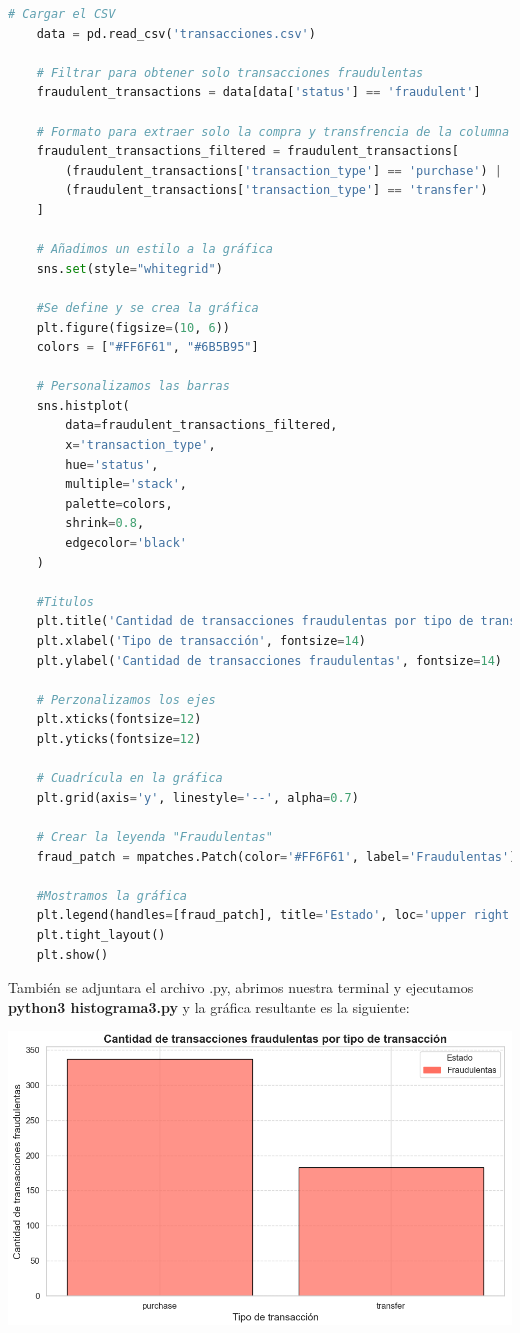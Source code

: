\documentclass{article}
\begin{document}
\begin{itemize}
\begin{lstlisting}[language=Python, caption=Implementación DES(Data Encryption Standard)]
    # Cargar el CSV
    data = pd.read_csv('transacciones.csv')

    # Filtrar para obtener solo transacciones fraudulentas
    fraudulent_transactions = data[data['status'] == 'fraudulent']

    # Formato para extraer solo la compra y transfrencia de la columna 'purchase' y 'transfer'
    fraudulent_transactions_filtered = fraudulent_transactions[
        (fraudulent_transactions['transaction_type'] == 'purchase') | 
        (fraudulent_transactions['transaction_type'] == 'transfer')
    ]

    # Añadimos un estilo a la gráfica
    sns.set(style="whitegrid")

    #Se define y se crea la gráfica
    plt.figure(figsize=(10, 6)) 
    colors = ["#FF6F61", "#6B5B95"]

    # Personalizamos las barras
    sns.histplot(
        data=fraudulent_transactions_filtered, 
        x='transaction_type', 
        hue='status', 
        multiple='stack', 
        palette=colors,
        shrink=0.8,  
        edgecolor='black'  
    )

    #Titulos
    plt.title('Cantidad de transacciones fraudulentas por tipo de transacción', fontsize=16, fontweight='bold')
    plt.xlabel('Tipo de transacción', fontsize=14)
    plt.ylabel('Cantidad de transacciones fraudulentas', fontsize=14)

    # Perzonalizamos los ejes
    plt.xticks(fontsize=12)
    plt.yticks(fontsize=12)

    # Cuadrícula en la gráfica 
    plt.grid(axis='y', linestyle='--', alpha=0.7)

    # Crear la leyenda "Fraudulentas"
    fraud_patch = mpatches.Patch(color='#FF6F61', label='Fraudulentas')

    #Mostramos la gráfica
    plt.legend(handles=[fraud_patch], title='Estado', loc='upper right', fontsize=12)
    plt.tight_layout()
    plt.show()
    \end{lstlisting}

    También se adjuntara el archivo .py, abrimos nuestra terminal y ejecutamos \textbf{python3 histograma3.py} y la gráfica resultante es la siguiente:

    \begin{center}
        \includegraphics[scale = .4]{IMAGE/Histograma3.png}
    \end{center}


\end{itemize}
\end{document}
